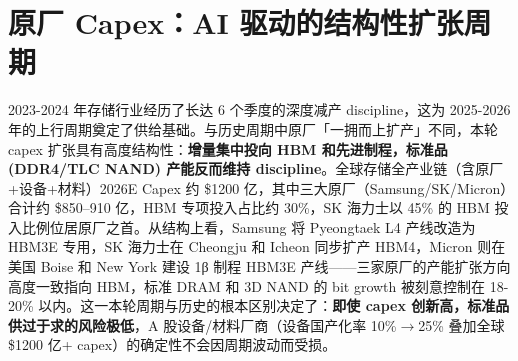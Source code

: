 
\section{原厂 Capex：AI 驱动的结构性扩张周期}

2023-2024 年存储行业经历了长达 6 个季度的深度减产 discipline，这为 2025-2026 年的上行周期奠定了供给基础。与历史周期中原厂「一拥而上扩产」不同，本轮 capex 扩张具有高度结构性：\textbf{增量集中投向 HBM 和先进制程，标准品 (DDR4/TLC NAND) 产能反而维持 discipline}。全球存储全产业链（含原厂+设备+材料）2026E Capex 约 \$1200 亿，其中三大原厂（Samsung\slash SK\slash Micron）合计约 \$850--910 亿，HBM 专项投入占比约 30\%，SK 海力士以 45\% 的 HBM 投入比例位居原厂之首。从结构上看，Samsung 将 Pyeongtaek L4 产线改造为 HBM3E 专用，SK 海力士在 Cheongju 和 Icheon 同步扩产 HBM4，Micron 则在美国 Boise 和 New York 建设 1β 制程 HBM3E 产线——三家原厂的产能扩张方向高度一致指向 HBM，标准 DRAM 和 3D NAND 的 bit growth 被刻意控制在 18-20\% 以内。这一本轮周期与历史的根本区别决定了：\textbf{即使 capex 创新高，标准品供过于求的风险极低}，A 股设备/材料厂商（设备国产化率 10\%\(\to\)25\% 叠加全球 \$1200 亿+ capex）的确定性不会因周期波动而受损。

